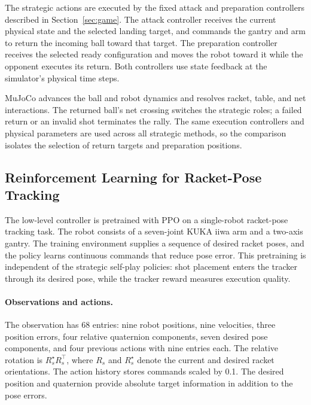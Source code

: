 \documentclass[pmlr]{jmlr}
\begin{document}
The strategic actions are executed by the fixed attack and preparation controllers described in Section~\ref{sec:game}. The attack controller receives the current physical state and the selected landing target, and commands the gantry and arm to return the incoming ball toward that target. The preparation controller receives the selected ready configuration and moves the robot toward it while the opponent executes its return. Both controllers use state feedback at the simulator's physical time steps.

MuJoCo advances the ball and robot dynamics and resolves racket, table, and net interactions. The returned ball's net crossing switches the strategic roles; a failed return or an invalid shot terminates the rally. The same execution controllers and physical parameters are used across all strategic methods, so the comparison isolates the selection of return targets and preparation positions.

\subsection{Reinforcement Learning for Racket-Pose Tracking}
\label{app:trackertraining}
The low-level controller is pretrained with PPO \citep{schulman2017ppo} on a single-robot racket-pose tracking task. The robot consists of a seven-joint KUKA iiwa arm and a two-axis gantry. The training environment supplies a sequence of desired racket poses, and the policy learns continuous commands that reduce pose error. This pretraining is independent of the strategic self-play policies: shot placement enters the tracker through its desired pose, while the tracker reward measures execution quality.

\paragraph{Observations and actions.}
The observation has 68 entries: nine robot positions, nine velocities, three position errors, four relative quaternion components, seven desired pose components, and four previous actions with nine entries each. The relative rotation is $R_s^\star R_s^\top$, where $R_s$ and $R_s^\star$ denote the current and desired racket orientations. The action history stores commands scaled by 0.1. The desired position and quaternion provide absolute target information in addition to the pose errors.
\end{document}
